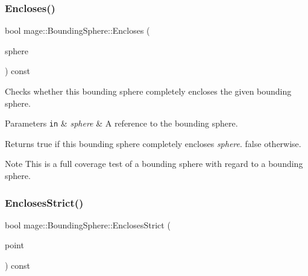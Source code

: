\subsubsection{\texorpdfstring{Encloses()}{Encloses()}\hspace{0.1cm}{\footnotesize\ttfamily [4/4]}}
{\footnotesize\ttfamily bool mage\+::\+Bounding\+Sphere\+::\+Encloses (\begin{DoxyParamCaption}\item[{const \hyperlink{classmage_1_1_bounding_sphere}{Bounding\+Sphere} \&}]{sphere }\end{DoxyParamCaption}) const\hspace{0.3cm}{\ttfamily [noexcept]}}

Checks whether this bounding sphere completely encloses the given bounding sphere.


\begin{DoxyParams}[1]{Parameters}
\mbox{\tt in}  & {\em sphere} & A reference to the bounding sphere. \\
\hline
\end{DoxyParams}
\begin{DoxyReturn}{Returns}
{\ttfamily true} if this bounding sphere completely encloses {\itshape sphere}. {\ttfamily false} otherwise. 
\end{DoxyReturn}
\begin{DoxyNote}{Note}
This is a full coverage test of a bounding sphere with regard to a bounding sphere. 
\end{DoxyNote}
\hypertarget{classmage_1_1_bounding_sphere_a749a8fa3317e5490c12b049e68f7d502}{}\label{classmage_1_1_bounding_sphere_a749a8fa3317e5490c12b049e68f7d502} 
\subsubsection{\texorpdfstring{Encloses\+Strict()}{EnclosesStrict()}\hspace{0.1cm}{\footnotesize\ttfamily [1/4]}}
{\footnotesize\ttfamily bool mage\+::\+Bounding\+Sphere\+::\+Encloses\+Strict (\begin{DoxyParamCaption}\item[{const \hyperlink{structmage_1_1_point3}{Point3} \&}]{point }\end{DoxyParamCaption}) const\hspace{0.3cm}{\ttfamily [noexcept]}}


